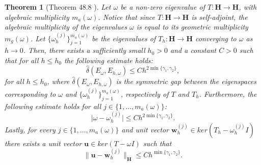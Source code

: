 \documentclass[USenglish]{article}
\theoremstyle{dgthm}
\newtheorem{theorem}{Theorem}
\theoremstyle{dgdef}
\let\vec\bm
\newcommand\norm[1]{\lVert#1\rVert}
\newcommand\abs[1]{\lvert#1\rvert}
\begin{document}
\begin{theorem}[Theorem 48.8 \cite{ErnGuermond}]
  Let $\omega$ be a non-zero eigenvalue of $T:\vec{H}\to\vec{H}$, with algebraic multiplicity $m_a(\omega)$. Notice that since $T:\vec{H}\to\vec{H}$ is self-adjoint, the algebraic multiplicity of the eigenvalues $\omega$ is equal to its geometric multiplicity $m_g(\omega)$.
  Let $\{\omega_h^{(j)}\}_{j=1}^{m_a(\omega)}$ be the eigenvalues of $T_h:\vec{H}\to\vec{H}$ converging to $\omega$ as $h\to 0$.
  Then, there exists a sufficiently small $h_0>0$ and a constant $C>0$ such that for all $h\leq h_0$ the following estimate holds:
  \begin{equation}
    \hat{\delta}(E_\omega,E_{h,\omega}) \leq C h^{2\min\{\gamma_1,\gamma_2\}},
  \end{equation}
  for all $h\leq h_0$, where $\hat{\delta}(E_\omega,E_{h,\omega})$ is the symmetric gap between the eigenspaces corresponding to $\omega$ and $\{\omega_h^{(j)}\}_{j=1}^{m_a(\omega)}$, respectively of $T$ and $T_h$.
  Furthermore, the following estimate holds for all $j\in \{1,\ldots,m_a(\omega)\}$:
  \begin{equation}
    \abs{\omega-\omega_h^{(j)}} \leq C h^{2\min\{\gamma_1,\gamma_2\}}.
  \end{equation} 
  Lastly, for every $j\in \{1,\ldots,m_a(\omega)\}$ and unit vector $\vec{w}_h^{(j)}\in ker\left(T_h-\omega_{h}^{(j)}I\right)$ there exists a unit vector $\vec{u}\in ker\left(T-\omega I\right)$ such that
  \begin{equation}
    \norm{\vec{u}-\vec{w}_h^{(j)}}_{\vec{H}}\leq C h^{\min\{\gamma_1,\gamma_2\}}.
  \end{equation}
\end{theorem}
\label{sec:approxCompact}

\end{document}
